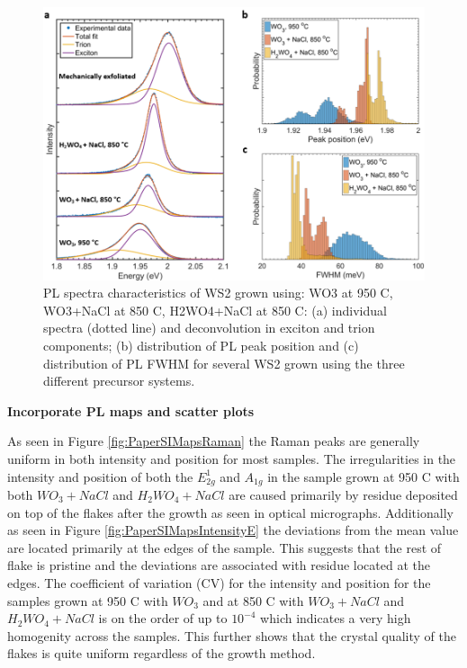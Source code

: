 \documentclass[12pt]{article}
\newcommand{\comment}[1]
{\par {\bfseries \color{blue} #1 \par}} %
\begin{document}
\begin{figure}[h]
\begin{center}
\includegraphics[scale=0.3]{PaperPLSpectraHistograms.png}
\caption{PL spectra characteristics of WS2 grown using: WO3 at 950 {\degree}C, WO3+NaCl at 850 {\degree}C, H2WO4+NaCl at 850 {\degree}C: (a) individual spectra (dotted line) and deconvolution in exciton and trion components; (b) distribution of PL peak position and (c) distribution of PL FWHM for several WS2 grown using the three different precursor systems.}
\label{fig:PaperPLSpectraHistograms}
\end{center}
\end{figure}

\comment{Incorporate PL maps and scatter plots}

As seen in Figure \ref{fig:PaperSIMapsRaman} the Raman peaks are generally uniform in both intensity and position for most samples. The irregularities in the intensity and position of both the $E^1_{2g}$ and $A_{1g}$ in the sample grown at 950 {\degree}C with both $WO_3 + NaCl$ and $H_2WO_4 + NaCl$ are caused primarily by residue deposited on top of the flakes after the growth as seen in optical micrographs. Additionally as seen in Figure \ref{fig:PaperSIMapsIntensityE} the deviations from the mean value are located primarily at the edges of the sample. This suggests that the rest of flake is pristine and the deviations are associated with residue located at the edges. The coefficient of variation (CV) for the intensity and position for the samples grown at 950 {\degree}C with $WO_3$ and at 850 {\degree}C with $WO_3 + NaCl$ and $H_2WO_4 + NaCl$ is on the order of up to $10^{-4}$ which indicates a very high homogenity across the samples. This further shows that the crystal quality of the flakes is quite uniform regardless of the growth method.
\end{document}
